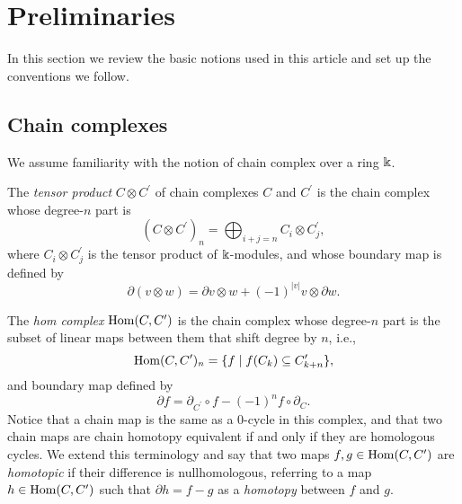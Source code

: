 
\section{Preliminaries} \label{s:preliminaries}

In this section we review the basic notions used in this article and set up the conventions we follow.

\subsection{Chain complexes}

We assume familiarity with the notion of chain complex over a ring $\Bbbk$.

The \textit{tensor product} $C \otimes C^\prime$ of chain complexes $C$ and $C^\prime$ is the chain complex whose degree-$n$ part is
\begin{equation*}
\left(C \otimes C^\prime\right)_n = \bigoplus_{i+j=n} C_i \otimes C^\prime_j,
\end{equation*}
where $C_i \otimes C^\prime_j$ is the tensor product of $\Bbbk$-modules, and whose boundary map is defined by
\begin{equation*}
\partial (v \otimes w) = \partial v \otimes w + (-1)^{|v|} v \otimes \partial w.
\end{equation*}

The \textit{hom complex} $\mathrm{Hom}(C, C^\prime)$ is the chain complex whose degree-$n$ part is the subset of linear maps between them that shift degree by $n$, i.e.,
\begin{equation*}
\mathrm{Hom}(C, C^\prime)_n = \{f \mid f(C_k) \subseteq C^\prime_{k+n}\},
\end{equation*}
and boundary map defined by
\begin{equation*}
\partial f = \partial_{C^\prime} \circ f - (-1)^{n} f \circ \partial_C.
\end{equation*}
Notice that a chain map is the same as a $0$-cycle in this complex, and that two chain maps are chain homotopy equivalent if and only if they are homologous cycles.
We extend this terminology and say that two maps $f, g \in \mathrm{Hom}(C, C^\prime)$ are \textit{homotopic} if their difference is nullhomologous, referring to a map $h \in \mathrm{Hom}(C, C^\prime)$ such that $\partial h = f - g$ as a \textit{homotopy} between $f$ and $g$.

